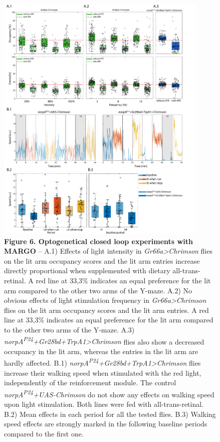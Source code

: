 \documentclass[10pt]{article}
\begin{document}
\newpage
\begin{figure}[t!]
	\begin{center}
		\includegraphics[width=0.9\textwidth]{../figures/figZach_modif2.pdf}
	\end{center}
	\caption*{\footnotesize \textbf{Figure 6. Optogenetical closed loop experiments with MARGO} -- A.1) Effects of light intensity in \textit{Gr66a>Chrimson} flies on the lit arm occupancy scores and the lit arm entries increase directly proportional when supplemented with dietary all-trans-retinal. A red line at 33,3\% indicates an equal preference for the lit arm compared to the other two arms of the Y-maze. A.2) No obvious effects of light stimulation frequency in \textit{Gr66a>Chrimson} flies on the lit arm occupancy scores and the lit arm entries. A red line at 33,3\% indicates an equal preference for the lit arm compared to the other two arms of the Y-maze. A.3) \textit{norpA\textsuperscript{P24}+Gr28bd+TrpA1>Chrimson} flies also show a decreased occupancy in the lit arm, whereas the entries in the lit arm are hardly affected. B.1) \textit{norpA\textsuperscript{P24}+Gr28bd+TrpA1>Chrimson} flies increase their walking speed when stimulated with the red light, independently of the reinforcement module. The control \textit{norpA\textsuperscript{P24}+UAS-Chrimson} do not show any effects on walking speed upon light stimulation. Both lines were fed with all-trans-retinal. B.2) Mean effects in each period for all the tested flies. B.3) Walking speed effects are strongly marked in the following baseline periods compared to the first one.}
\end{figure}
\end{document}
